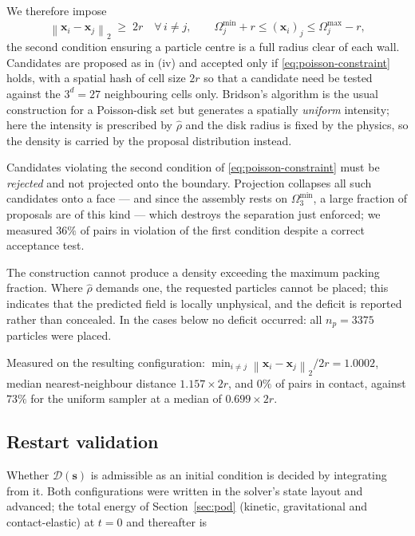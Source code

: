 \documentclass[11pt]{article}
\newcommand{\bs}[1]{\boldsymbol{#1}}
\newcommand{\norm}[1]{\left\lVert #1 \right\rVert}
\begin{document}
We therefore impose
\begin{equation}
  \norm{ \bs{x}_i - \bs{x}_j }_2 \; \geq \; 2r \quad \forall\, i \neq j,
  \qquad
  \Omega_j^{\min} + r \leq (\bs{x}_i)_j \leq \Omega_j^{\max} - r ,
  \label{eq:poisson-constraint}
\end{equation}
the second condition ensuring a particle centre is a full radius clear of each wall. Candidates are
proposed as in (iv) and accepted only if \eqref{eq:poisson-constraint} holds, with a spatial hash of
cell size $2r$ so that a candidate need be tested against the $3^d = 27$ neighbouring cells only.
Bridson's algorithm is the usual construction for a Poisson-disk set but generates a spatially
\emph{uniform} intensity; here the intensity is prescribed by $\hat{\rho}$ and the disk radius is
fixed by the physics, so the density is carried by the proposal distribution instead.

Candidates violating the second condition of \eqref{eq:poisson-constraint} must be \emph{rejected} and
not projected onto the boundary. Projection collapses all such candidates onto a face --- and since the
assembly rests on $\Omega_3^{\min}$, a large fraction of proposals are of this kind --- which destroys
the separation just enforced; we measured $36\%$ of pairs in violation of the first condition despite a
correct acceptance test.

The construction cannot produce a density exceeding the maximum packing fraction. Where $\hat{\rho}$
demands one, the requested particles cannot be placed; this indicates that the predicted field is
locally unphysical, and the deficit is reported rather than concealed. In the cases below no deficit
occurred: all $n_p = 3375$ particles were placed.

Measured on the resulting configuration: $\min_{i \neq j} \norm{\bs{x}_i - \bs{x}_j}_2 / 2r = 1.0002$,
median nearest-neighbour distance $1.157 \times 2r$, and $0\%$ of pairs in contact, against $73\%$ for
the uniform sampler at a median of $0.699 \times 2r$.

\subsection{Restart validation}
\label{sec:restart}

Whether $\mathcal{D}(\bs{s})$ is admissible as an initial condition is decided by integrating from it.
Both configurations were written in the solver's state layout and advanced; the total energy of
Section~\ref{sec:pod} (kinetic, gravitational and contact-elastic) at $t=0$ and thereafter is
\end{document}
